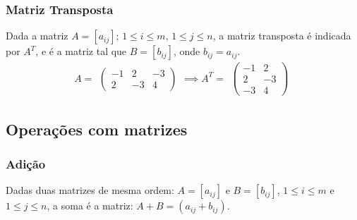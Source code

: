 \documentclass[12pt]{article}
\begin{document}
\subsubsection{Matriz Transposta}
Dada a matriz $A=[a_{ij}]$; $1 \leq i \leq m \text{, } 1 \leq j \leq n$, a matriz transposta é indicada por
$A^T$, e é a matriz tal que $B=[b_{ij}]$, onde $b_{ij} = a_{ij}$.
\noindent
\[
A =
    \begin{array}{c}
        \begin{pmatrix}
            -1  &  2  & -3 \\
            2  & -3  &  4
        \end{pmatrix}
    \end{array}
\implies
A^T = 
    \begin{array}{c}
        \begin{pmatrix}
            -1  &  2 \\
             2  & -3 \\
            -3  &  4
        \end{pmatrix}
    \end{array}
\]

\subsection{Operações com matrizes}
\subsubsection{Adição}
Dadas duas matrizes de mesma ordem: $A=[a_{ij}] \text{ e } B=[b_{ij}]$, $1 \leq i \leq m$ e $1 \leq j \leq n$, a soma é a matriz: $A+B=(a_{ij}+b_{ij})$.
\end{document}

